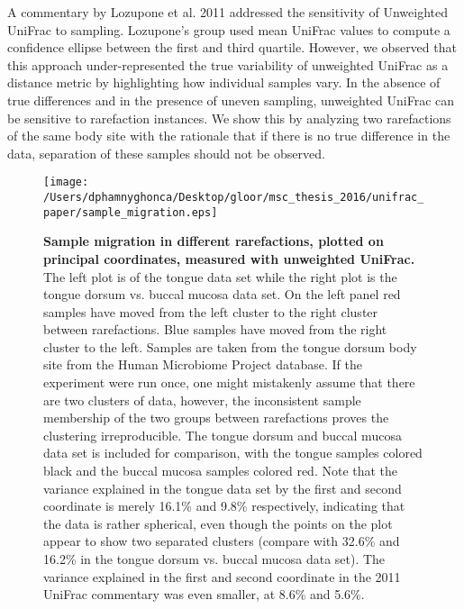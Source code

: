 \documentclass[10pt,letterpaper]{article}
\begin{document}
A commentary by Lozupone et al. 2011 \cite{lozupone2011unifrac} addressed the sensitivity of Unweighted UniFrac to sampling. Lozupone's group used mean UniFrac values to compute a confidence ellipse between the first and third quartile. However, we observed that this approach under-represented the true variability of unweighted UniFrac as a distance metric by highlighting how individual samples vary. In the absence of true differences and in the presence of uneven sampling, unweighted UniFrac can be sensitive to rarefaction instances. We show this by analyzing two rarefactions of the same body site with the rationale that if there is no true difference in the data, separation of these samples should not be observed.

\begin{figure}[h]
\texttt{[image: /Users/dphamnyghonca/Desktop/gloor/msc\_thesis\_2016/unifrac\_paper/sample\_migration.eps]}
\caption[Sample migration in different rarefactions, plotted on principal coordinates, measured with unweighted UniFrac.]{{\bf Sample migration in different rarefactions, plotted on principal coordinates, measured with unweighted UniFrac.}
The left plot is of the tongue data set while the right plot is the tongue dorsum vs. buccal mucosa data set. On the left panel red samples have moved from the left cluster to the right cluster between rarefactions. Blue samples have moved from the right cluster to the left. Samples are taken from the tongue dorsum body site from the Human Microbiome Project database. If the experiment were run once, one might mistakenly assume that there are two clusters of data, however, the inconsistent sample membership of the two groups between rarefactions proves the clustering irreproducible. The tongue dorsum and buccal mucosa data set is included for comparison, with the tongue samples colored black and the buccal mucosa samples colored red. Note that the variance explained in the tongue data set by the first and second coordinate is merely 16.1\% and 9.8\% respectively, indicating that the data is rather spherical, even though the points on the plot appear to show two separated clusters (compare with 32.6\% and 16.2\% in the tongue dorsum vs. buccal mucosa data set). The variance explained in the first and second coordinate in the 2011 UniFrac commentary \cite{lozupone2011unifrac} was even smaller, at 8.6\% and 5.6\%.}
\label{fig2}
\end{figure}
\end{document}
